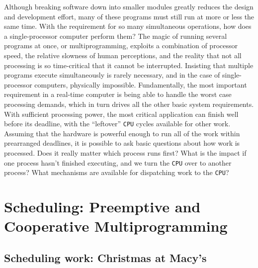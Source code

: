 \documentclass[refcap, oxford]{ahsan}
\begin{document}
Although breaking software down into smaller modules greatly reduces the design and development effort, many of these programs must still run at more or less the same time. With the requirement for so many simultaneous operations, how does a single-processor computer perform them? The magic of running several programs at once, or multiprogramming, exploits a combination of processor speed, the relative slowness of human perceptions, and the reality that not all processing is so time-critical that it cannot be interrupted. Insisting that multiple programs execute simultaneously is rarely necessary, and in the case of single-processor computers, physically impossible. Fundamentally, the most important requirement in a real-time computer is being able to handle the worst case processing demands, which in turn drives all the other basic system requirements. With sufficient processing power, the most critical application can finish well before its deadline, with the ``leftover'' \texttt{CPU} cycles available for other work. Assuming that the hardware is powerful enough to run all of the work within prearranged deadlines, it is possible to ask basic questions about how work is processed. Does it really matter which process runs first? What is the impact if one process hasn't finished executing, and we turn the \texttt{CPU} over to another process? What mechanisms are available for dispatching work to the \texttt{CPU}?





\section{Scheduling: Preemptive and Cooperative Multiprogramming}


\subsection{Scheduling work: Christmas at Macy's}
\end{document}
